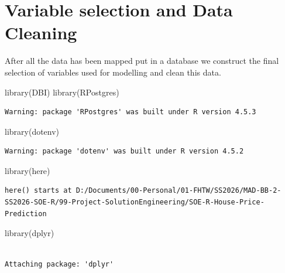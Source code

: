 \documentclass[
  english,
  letterpaper,
  DIV=11,
  numbers=noendperiod]{scrreprt}
\newenvironment{Shaded}{\begin{snugshade}}{\end{snugshade}}
\newcommand{\FunctionTok}[1]{\textcolor[rgb]{0.28,0.35,0.67}{#1}}
\newcommand{\NormalTok}[1]{\textcolor[rgb]{0.00,0.23,0.31}{#1}}
\begin{document}

\chapter{Variable selection and Data
Cleaning}\label{variable-selection-and-data-cleaning}

After all the data has been mapped put in a database we construct the
final selection of variables used for modelling and clean this data.

\begin{Shaded}
\begin{Highlighting}[]
\FunctionTok{library}\NormalTok{(DBI)}
\FunctionTok{library}\NormalTok{(RPostgres)}
\end{Highlighting}
\end{Shaded}

\begin{verbatim}
Warning: package 'RPostgres' was built under R version 4.5.3
\end{verbatim}

\begin{Shaded}
\begin{Highlighting}[]
\FunctionTok{library}\NormalTok{(dotenv)}
\end{Highlighting}
\end{Shaded}

\begin{verbatim}
Warning: package 'dotenv' was built under R version 4.5.2
\end{verbatim}

\begin{Shaded}
\begin{Highlighting}[]
\FunctionTok{library}\NormalTok{(here)}
\end{Highlighting}
\end{Shaded}

\begin{verbatim}
here() starts at D:/Documents/00-Personal/01-FHTW/SS2026/MAD-BB-2-SS2026-SOE-R/99-Project-SolutionEngineering/SOE-R-House-Price-Prediction
\end{verbatim}

\begin{Shaded}
\begin{Highlighting}[]
\FunctionTok{library}\NormalTok{(dplyr)}
\end{Highlighting}
\end{Shaded}

\begin{verbatim}

Attaching package: 'dplyr'
\end{verbatim}
\end{document}
